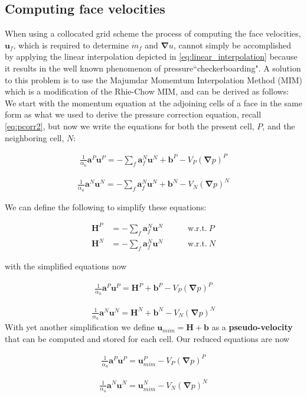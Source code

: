 \documentclass[11pt,letterpaper,titlepage]{article}
\newcommand{\beq}{\begin{equation*}
\begin{aligned}}
\newcommand{\eeq}{\end{aligned}
\end{equation*}}
\newcommand{\beqn}{\begin{equation}
	\begin{aligned}}
\newcommand{\eeqn}{\end{aligned}
	\end{equation}}
\newcommand{\bnabla}{\boldsymbol{\nabla}}
\newcommand{\bvel}{\mathbf{u}}
\numberwithin{equation}{section}
\begin{document}
\subsection{Computing face velocities}
When using a collocated grid scheme the process of computing the face velocities, $\bvel_f$, which is required to determine $\dot{m}_f$ and $\bnabla u$, cannot simply be accomplished by applying the linear interpolation depicted in \eqref{eq:linear_interpolation} because it results in the well known phenomenon of pressure``checkerboarding". A solution to this problem is to use the Majumdar Momemtum Interpolation Method (MIM) which is a modification of the Rhie-Chow MIM, and can be derived as follows:
\newline
\newline
We start with the momentum equation at the adjoining cells of a face in the same form as what we used to derive the pressure correction equation, recall \eqref{eq:pcorr2}, but now we write the equations for both the present cell, $P$, and the neighboring cell, $N$:

\beq
\frac{1}{\alpha_u} \mathbf{a}^P \bvel^P  = 
- \sum_f \mathbf{a}_f^N \bvel^N +
\mathbf{b}^P 
-V_P (\bnabla p)^P
\eeq

\beq
\frac{1}{\alpha_u} \mathbf{a}^N \bvel^N  = 
- \sum_f \mathbf{a}_f^N \bvel^N +
\mathbf{b}^N
-V_N (\bnabla p)^N
\eeq

We can define the following to simplify these equations:

\beqn
\mathbf{H}^P &= -\sum_f \mathbf{a}_f^N \bvel^N \quad \quad \quad \text{w.r.t.}  \ P \\
\mathbf{H}^N &= -\sum_f \mathbf{a}_f^N \bvel^N \quad \quad \quad \text{w.r.t.}  \ N 
\eeqn

with the simplified equations now

\beq
\frac{1}{\alpha_u} \mathbf{a}^P \bvel^P  = 
\mathbf{H}^P +
\mathbf{b}^P
-V_P (\bnabla p)^P
\eeq

\beq
\frac{1}{\alpha_u} \mathbf{a}^N \bvel^N  = 
\mathbf{H}^N +
\mathbf{b}^N
-V_N (\bnabla p)^N
\eeq
\newline
With yet another simplification we define $\bvel_{mim} = \mathbf{H} + \mathbf{b}$ as a \textbf{pseudo-velocity} that can be computed and stored for each cell. Our reduced equations are now

\beq
\frac{1}{\alpha_u} \mathbf{a}^P \bvel^P  = \bvel_{mim}^P - V_P (\bnabla p)^P
\eeq

\beq
\frac{1}{\alpha_u} \mathbf{a}^N \bvel^N  = \bvel_{mim}^N - V_N (\bnabla p)^N
\eeq
\end{document}
